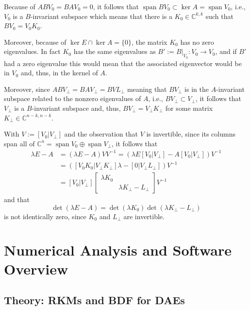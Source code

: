 \documentclass[]{book}
\theoremstyle{definition}
\theoremstyle{definition}
\theoremstyle{definition}
\theoremstyle{remark}
\begin{document}
Because of \(ABV_0=BAV_0=0\), it follows that \(\operatorname{span}BV_0 \subset \ker A = \operatorname{span}V_0\), i.e., \(V_0\) is a \(B\)-invariant subspace which means that there is a \(K_0\in \mathbb C^{k,k}\) such that \(BV_0 =V_0K_0\).

Moreover, because of \(\ker E \cap \ker A = \{0\}\), the matrix \(K_0\) has no zero eigenvalues. In fact \(K_0\) has the same eigenvalues as \(B':=B\bigr|_{V_0}\colon V_0 \to V_0\), and if \(B'\) had a zero eigenvalue this would mean that the associated eigenvector would be in \(V_0\) and, thus, in the kernel of \(A\).

Moreover, since \(ABV_\perp=BAV_\perp=BVL_\perp\) meaning that \(BV_\perp\) is in the \(A\)-invariant subspace related to the nonzero eigenvalues of \(A\), i.e., \(BV_\perp \subset V_\perp\), it follows that \(V_\perp\) is a \(B\)-invariant subspace and, thus, \(BV_\perp = V_\perp K_\perp\) for some matrix \(K_\perp \in \mathbb C^{n-k,n-k}\).

With \(V:=[V_0 |V_\perp]\) and the observation that \(V\) is invertible, since its columns span all of \(\mathbb C^n = \operatorname{span}V_0 \oplus \operatorname{span}V_\perp\), it follows that
\begin{equation*}
\begin{split}
\lambda E - A & = (\lambda E - A)VV^{-1} = (\lambda E [V_0 |V_\perp]- A[V_0 |V_\perp])V^{-1}  \\
& = ([V_0 K_0 |V_\perp K_\perp]\lambda  - [0 |V_\perp L_\perp])V^{-1} \\
& = [V_0 |V_\perp ]
\begin{bmatrix}
 \lambda K_0 & \\ & \lambda K_\perp - L_\perp
\end{bmatrix}
V^{-1}
\end{split}
\end{equation*}
and that
\[
\det (\lambda E - A) = \det (\lambda K_0) \det(\lambda K_\perp - L_\perp) 
\]
is not identically zero, since \(K_0\) and \(L_\perp\) are invertible.

\hypertarget{numerical-analysis-and-software-overview}{%
\chapter{Numerical Analysis and Software Overview}\label{numerical-analysis-and-software-overview}}

\hypertarget{theory-rkms-and-bdf-for-daes}{%
\section{Theory: RKMs and BDF for DAEs}\label{theory-rkms-and-bdf-for-daes}}
\end{document}
